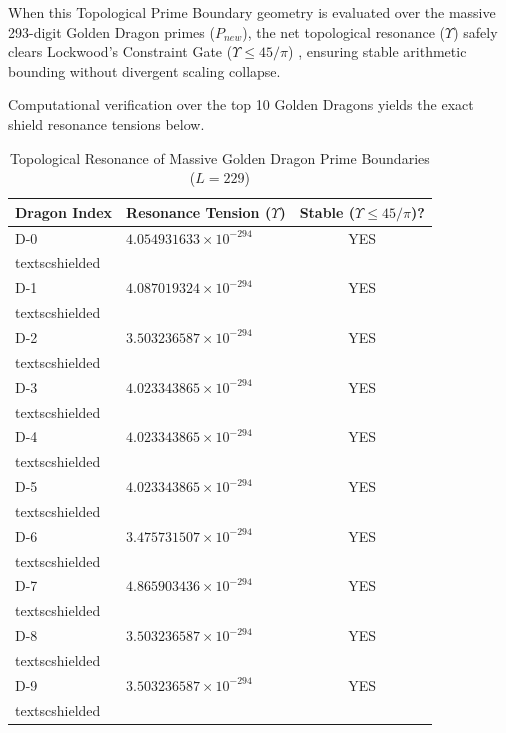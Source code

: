 When this Topological Prime Boundary geometry is evaluated over the massive 293-digit Golden Dragon primes ($P_{new}$), the net topological resonance ($\Upsilon$) safely clears Lockwood's Constraint Gate ($\Upsilon \le 45/\pi$) \cite{lockwood_chrono}, ensuring stable arithmetic bounding without divergent scaling collapse.

Computational verification over the top 10 Golden Dragons yields the exact shield resonance tensions below.

\begin{table}[h]
\centering
\caption{Topological Resonance of Massive Golden Dragon Prime Boundaries ($L=229$)}
\label{tab:golden_bubble}
\begin{tabular}{@{}llc@{}}
\toprule
Dragon Index & Resonance Tension ($\Upsilon$) & Stable ($\Upsilon \le 45/\pi$)? \\
\midrule
D-0 & $4.054931633 \times 10^{-294}$ & YES \\textsc{shielded} \\
D-1 & $4.087019324 \times 10^{-294}$ & YES \\textsc{shielded} \\
D-2 & $3.503236587 \times 10^{-294}$ & YES \\textsc{shielded} \\
D-3 & $4.023343865 \times 10^{-294}$ & YES \\textsc{shielded} \\
D-4 & $4.023343865 \times 10^{-294}$ & YES \\textsc{shielded} \\
D-5 & $4.023343865 \times 10^{-294}$ & YES \\textsc{shielded} \\
D-6 & $3.475731507 \times 10^{-294}$ & YES \\textsc{shielded} \\
D-7 & $4.865903436 \times 10^{-294}$ & YES \\textsc{shielded} \\
D-8 & $3.503236587 \times 10^{-294}$ & YES \\textsc{shielded} \\
D-9 & $3.503236587 \times 10^{-294}$ & YES \\textsc{shielded} \\
\bottomrule
\end{tabular}
\end{table}


